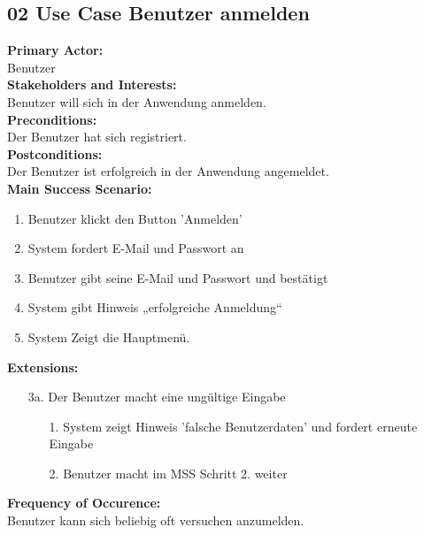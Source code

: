 \documentclass[12pt,a4paper,onecolumn]{article}
\begin{document}
\subsection{02 Use Case Benutzer anmelden}
\textbf{Primary Actor:}\\ Benutzer\\
\textbf{Stakeholders and Interests:}\\
Benutzer will sich in der Anwendung anmelden.\\
\textbf{Preconditions:} \\ Der Benutzer hat sich registriert.\\
\textbf{Postconditions:}\\ Der Benutzer ist erfolgreich in der Anwendung angemeldet.\\
\textbf{Main Success Scenario:}
\begin{enumerate}
    \item Benutzer klickt den Button 'Anmelden'
    \item System fordert E-Mail und Passwort an
    \item Benutzer gibt seine E-Mail und Passwort und bestätigt 
    \item System gibt Hinweis „erfolgreiche Anmeldung“ 
    \item System Zeigt die Hauptmenü.
\end{enumerate}
\textbf{Extensions:}
\begin{enumerate}
    \item [3a.]  Der Benutzer macht eine ungültige Eingabe
    \begin{enumerate}
        \item[1.]System zeigt Hinweis 'falsche Benutzerdaten' und fordert erneute Eingabe
        \item[2.]Benutzer macht im MSS Schritt 2. weiter
    \end{enumerate}
\end{enumerate}
\textbf{Frequency of Occurence:}\\ Benutzer kann sich beliebig oft versuchen anzumelden.\\
\end{document}
